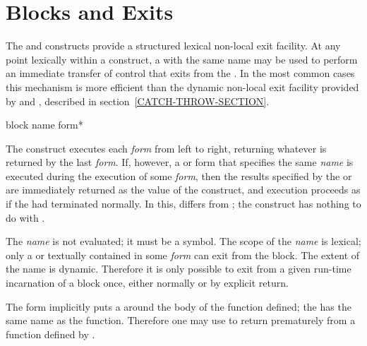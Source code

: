 \section{Blocks and Exits}
\label{BLOCK-RETURN-SECTION}

The  and  constructs provide a structured lexical
non-local exit facility.  At any point lexically within a 
construct, a  with the same name may be used to
perform an immediate transfer of control that
exits from the .  In the most common cases this mechanism is
more efficient than the dynamic non-local exit facility
provided by  and , described in
section~\ref{CATCH-THROW-SECTION}.

\begin{defspec}
block name {form}*

The  construct executes each \emph{form} from left to right,
returning whatever is returned by the last \emph{form}.
If, however, a  or  form that specifies the
same \emph{name} is executed
during the execution of some \emph{form}, then the results
specified by the  or  are immediately
returned as the value of the  construct, and execution
proceeds as if the  had terminated normally.
In this,  differs from ; the  construct
has nothing to do with .

The \emph{name} is not evaluated; it must be a symbol.
The scope of the \emph{name} is lexical; only a  or 
textually contained in some \emph{form} can exit from the block.
The extent of the name is dynamic.
Therefore it is only possible to exit from a given run-time incarnation of a
block once, either normally or by explicit return.

The  form implicitly puts a  around the
body of the function defined; the  has the same name as the function.
Therefore one may use  to return
prematurely from a function defined by .


\end{defspec}
